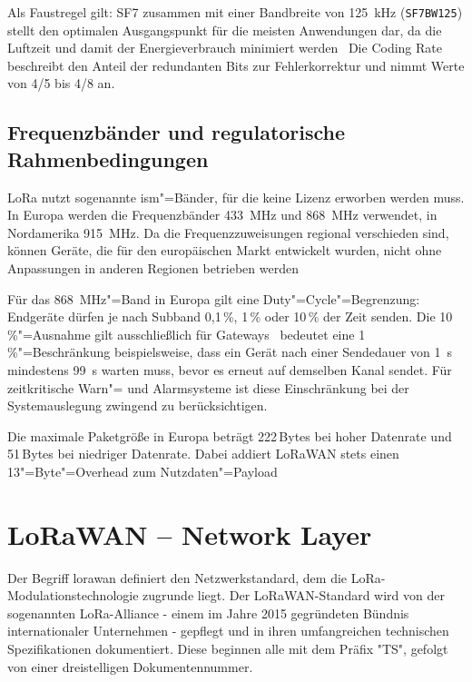 Als Faustregel gilt: SF7 zusammen mit einer Bandbreite von \qty{125}{kHz}
(\texttt{SF7BW125}) stellt den optimalen Ausgangspunkt für die meisten Anwendungen
dar, da die Luftzeit und damit der Energieverbrauch minimiert werden~%
Die Coding Rate beschreibt den Anteil der redundanten Bits zur Fehlerkorrektur und
nimmt Werte von 4/5 bis 4/8 an.

\subsection{Frequenzbänder und regulatorische Rahmenbedingungen}
\label{subsec:frequenzbaender}

LoRa nutzt sogenannte \acrfull{ism}"=Bänder, für die keine Lizenz erworben werden muss.
In Europa werden die Frequenzbänder \SI{433}{\MHz} und \SI{868}{\MHz} verwendet,
in Nordamerika \SI{915}{\MHz}. Da die Frequenzzuweisungen regional verschieden sind,
können Geräte, die für den europäischen Markt entwickelt wurden, nicht ohne
Anpassungen in anderen Regionen betrieben werden~%

Für das \SI{868}{\MHz}"=Band in Europa gilt eine Duty"=Cycle"=Begrenzung: Endgeräte
dürfen je nach Subband 0{,}1\,\%, 1\,\% oder 10\,\% der Zeit senden. Die
10\,\%"=Ausnahme gilt ausschließlich für Gateways~%
bedeutet eine 1\,\%"=Beschränkung beispielsweise, dass ein Gerät nach einer
Sendedauer von \SI{1}{\s} mindestens \SI{99}{\s} warten muss, bevor es erneut auf
demselben Kanal sendet. Für zeitkritische Warn"= und Alarmsysteme ist diese
Einschränkung bei der Systemauslegung zwingend zu berücksichtigen.

Die maximale Paketgröße in Europa beträgt 222\,Bytes bei hoher Datenrate und
51\,Bytes bei niedriger Datenrate. Dabei addiert LoRaWAN stets einen
13"=Byte"=Overhead zum Nutzdaten"=Payload~%

\section{LoRaWAN -- Network Layer} %
\label{sec:lorawan-network}

Der Begriff \acrfull{lorawan} definiert den Netzwerkstandard, dem die LoRa-Modulationstechnologie zugrunde liegt.
Der LoRaWAN-Standard wird von der sogenannten LoRa-Alliance - einem im Jahre 2015 gegründeten
Bündnis internationaler Unternehmen - gepflegt und in ihren umfangreichen technischen Spezifikationen dokumentiert.
Diese beginnen alle mit dem Präfix "TS", gefolgt von einer dreistelligen Dokumentennummer. 

